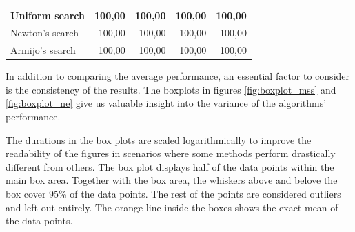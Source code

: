 \documentclass[english, 12pt, a4paper, sci, utf8, a-1b, online, table]{aaltothesis}
\begin{document}
\begin{table}[H]
\begin{tabular}{|l|r|r|r|r|}
    Uniform search                                                             & 100,00                                                   & 100,00                                                    & 100,00                                                    & 100,00                                                    \\ \hline
    Newton's search                                                             & 100,00                                                   & 100,00                                                    & 100,00                                                    & 100,00                                                    \\ \hline
    Armijo's search                                                              & 100,00                                                   & 100,00                                                    & 100,00                                                    & 100,00                                                    \\ \hline
    \end{tabular}
\end{table}


In addition to comparing the average performance, an essential factor to consider is the consistency of the results. The boxplots in figures \ref{fig:boxplot_mss} and \ref{fig:boxplot_ne} give us valuable insight into the variance of the algorithms' performance.

The durations in the box plots are scaled logarithmically to improve the readability of the figures in scenarios where some methods perform drastically different from others. The box plot displays half of the data points within the main box area. Together with the box area, the whiskers above and belove the box cover 95\% of the data points. The rest of the points are considered outliers and left out entirely. The orange line inside the boxes shows the exact mean of the data points.
\end{document}
